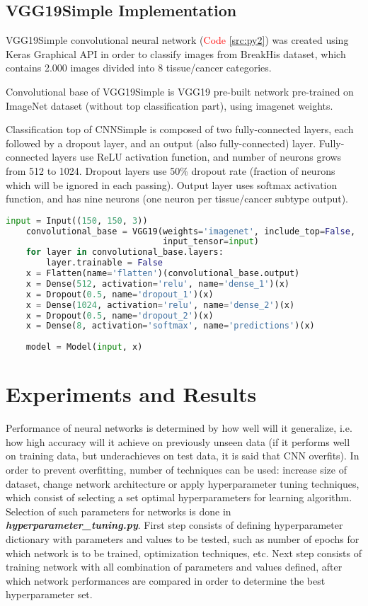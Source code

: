 \subsection{VGG19Simple Implementation}

VGG19Simple convolutional neural network (\textcolor{red}{Code \ref{src:py2}}) was created using Keras Graphical API in order to classify images from BreakHis dataset, which contains 2.000 images divided into 8 tissue/cancer categories. 

Convolutional base of VGG19Simple is VGG19 pre-built network pre-trained on ImageNet dataset (without top classification part), using imagenet weights.

Classification top of CNNSimple is composed of two fully-connected layers, each followed by a dropout layer, and an output (also fully-connected) layer. Fully-connected layers use ReLU activation function, and number of neurons grows from 512 to 1024. Dropout layers use 50\% dropout rate (fraction of neurons which will be ignored in each passing). Output layer uses softmax activation function, and has nine neurons (one neuron per tissue/cancer subtype output). 

\vspace{3mm}
\begin{lstlisting}[language={Python}, basicstyle=\scriptsize]
	input = Input((150, 150, 3))
	convolutional_base = VGG19(weights='imagenet', include_top=False,
	                           input_tensor=input)
	for layer in convolutional_base.layers:
		layer.trainable = False
	x = Flatten(name='flatten')(convolutional_base.output)
	x = Dense(512, activation='relu', name='dense_1')(x)
	x = Dropout(0.5, name='dropout_1')(x)
	x = Dense(1024, activation='relu', name='dense_2')(x)
	x = Dropout(0.5, name='dropout_2')(x)
	x = Dense(8, activation='softmax', name='predictions')(x)
	
	model = Model(input, x)
\end{lstlisting} 

\section{Experiments and Results}

Performance of neural networks is determined by how well will it generalize, i.e. how high accuracy will it achieve on previously unseen data (if it performs well on training data, but underachieves on test data, it is said that CNN overfits). In order to prevent overfitting, number of techniques can be used: increase size of dataset, change network architecture or apply hyperparameter tuning techniques, which consist of selecting a set optimal hyperparameters for learning algorithm. Selection of such parameters for networks is done in \textbf{\emph{hyperparameter\_tuning.py}}. First step consists of defining hyperparameter dictionary with parameters and values to be tested, such as number of epochs for which network is to be trained, optimization techniques, etc. Next step consists of training network with all combination of parameters and values defined, after which network performances are compared in order to determine the best hyperparameter set.


